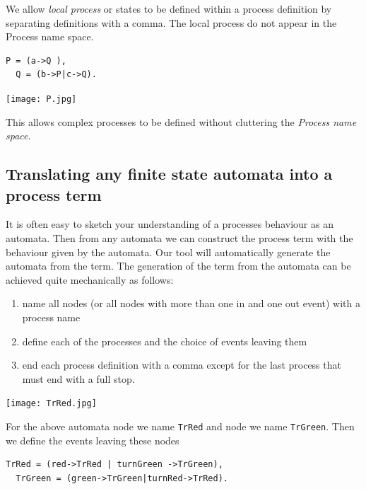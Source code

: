 \documentclass[]{article}
\begin{document}
  We allow \emph{local process} or states to be defined within a process  definition by separating definitions with a comma. The local process do not appear in the Process name space.

\begin{center}\begin{minipage}{0.25\textwidth}
\begin{verbatim}
P = (a->Q ),
  Q = (b->P|c->Q).
\end{verbatim}
\end{minipage}
\begin{minipage}{0.25\textwidth}\texttt{[image: P.jpg]}
\end{minipage}
\end{center}
This allows complex processes to be defined without cluttering the \emph{Process name space}.

\subsection{Translating any finite state automata  into a process term}
It is often easy to   sketch  your understanding of a processes behaviour as an automata. Then from any automata  we can construct  the  process term with  the behaviour given by the automata.  Our tool  will automatically generate  the automata from the term.  The generation of the term from the automata  can be achieved quite mechanically as follows:

\begin{enumerate}
\item name all nodes (or all nodes with more than one in and one out event) with a process name
\item define each of the processes and the choice of events leaving them
\item end each process definition with a comma except for the last process that must end with a full stop.
\end{enumerate}

\noindent\begin{center} \texttt{[image: TrRed.jpg]} \end{center}

For the above automata node {} we name \verb$TrRed$ and  node {} we name \verb$TrGreen$. Then we define the events leaving these nodes
\begin{center}\begin{minipage}{0.5\textwidth}
\begin{verbatim}
TrRed = (red->TrRed | turnGreen ->TrGreen),
  TrGreen = (green->TrGreen|turnRed->TrRed).
\end{verbatim}
\end{minipage}\end{center}
\end{document}
